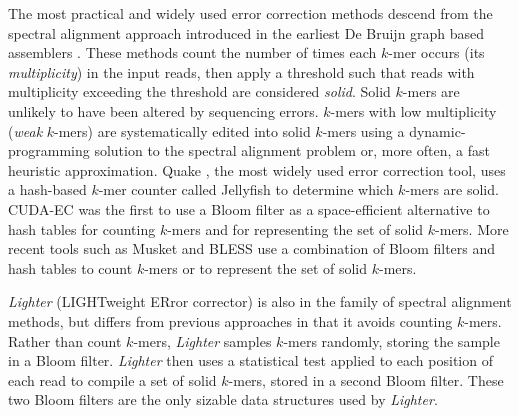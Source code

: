\documentclass[10pt]{article}
\begin{document}

The most practical and widely used error correction methods descend from the spectral alignment approach introduced in the earliest De Bruijn graph based assemblers \cite{pevzner2001eulerian, chaisson2004fragment}.
These methods count the number of times each $k$-mer occurs (its \emph{multiplicity}) in the input reads, then apply a threshold such that reads with multiplicity exceeding the threshold are considered \emph{solid}.
Solid $k$-mers are unlikely to have been altered by sequencing errors.
$k$-mers with low multiplicity (\emph{weak} $k$-mers) are systematically edited into solid $k$-mers using a dynamic-programming solution to the spectral alignment problem \cite{pevzner2001eulerian, chaisson2004fragment} or, more often, a fast heuristic approximation.
Quake \cite{kelley2010quake}, the most widely used error correction tool, uses a hash-based $k$-mer counter called Jellyfish \cite{marccais2011fast} to determine which $k$-mers are solid.
CUDA-EC \cite{shi2010parallel} was the first to use a Bloom filter as a space-efficient alternative to hash tables for counting $k$-mers and for representing the set of solid $k$-mers.
More recent tools such as Musket \cite{liu2013musket} and BLESS \cite{heo2014bless} use a combination of Bloom filters and hash tables to count $k$-mers or to represent the set of solid $k$-mers.

\emph{Lighter} (LIGHTweight ERror corrector) is also in the family of spectral alignment methods, but differs from previous approaches in that it avoids counting $k$-mers.
Rather than count $k$-mers, \emph{Lighter} samples $k$-mers randomly, storing the sample in a Bloom filter.
\emph{Lighter} then uses a statistical test applied to each position of each read to compile a set of solid $k$-mers, stored in a second Bloom filter.
These two Bloom filters are the only sizable data structures used by \emph{Lighter}.
\end{document}
